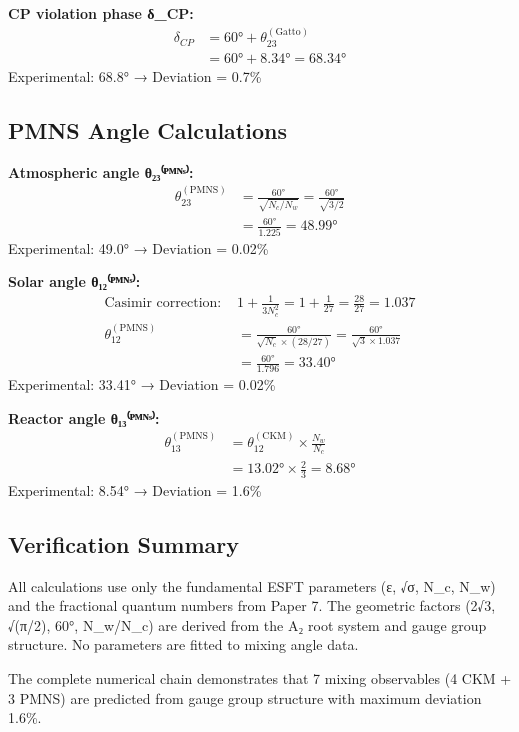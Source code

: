 ﻿\documentclass[prd,twocolumn,showpacs,superscriptaddress,groupedaddress]{revtex4-2}
\begin{document}
\textbf{CP violation phase δ_CP:}
\begin{align}
\delta_{CP} &= 60° + \theta_{23}^{(\text{Gatto})} \\
&= 60° + 8.34° = 68.34°
\end{align}
Experimental: 68.8° → Deviation = 0.7\%

\subsection{PMNS Angle Calculations}

\textbf{Atmospheric angle θ₂₃⁽ᴾᴹᴺˢ⁾:}
\begin{align}
\theta_{23}^{(\text{PMNS})} &= \frac{60°}{\sqrt{N_c/N_w}} = \frac{60°}{\sqrt{3/2}} \\
&= \frac{60°}{1.225} = 48.99°
\end{align}
Experimental: 49.0° → Deviation = 0.02\%

\textbf{Solar angle θ₁₂⁽ᴾᴹᴺˢ⁾:}
\begin{align}
\text{Casimir correction: } &1 + \frac{1}{3N_c^2} = 1 + \frac{1}{27} = \frac{28}{27} = 1.037 \\
\theta_{12}^{(\text{PMNS})} &= \frac{60°}{\sqrt{N_c} \times (28/27)} = \frac{60°}{\sqrt{3} \times 1.037} \\
&= \frac{60°}{1.796} = 33.40°
\end{align}
Experimental: 33.41° → Deviation = 0.02\%

\textbf{Reactor angle θ₁₃⁽ᴾᴹᴺˢ⁾:}
\begin{align}
\theta_{13}^{(\text{PMNS})} &= \theta_{12}^{(\text{CKM})} \times \frac{N_w}{N_c} \\
&= 13.02° \times \frac{2}{3} = 8.68°
\end{align}
Experimental: 8.54° → Deviation = 1.6\%

\subsection{Verification Summary}

All calculations use only the fundamental ESFT parameters (ε, √σ, N_c, N_w) and the fractional quantum numbers from Paper 7. The geometric factors (2√3, √(π/2), 60°, N_w/N_c) are derived from the A₂ root system and gauge group structure. No parameters are fitted to mixing angle data.

The complete numerical chain demonstrates that 7 mixing observables (4 CKM + 3 PMNS) are predicted from gauge group structure with maximum deviation 1.6\%.
\end{document}
